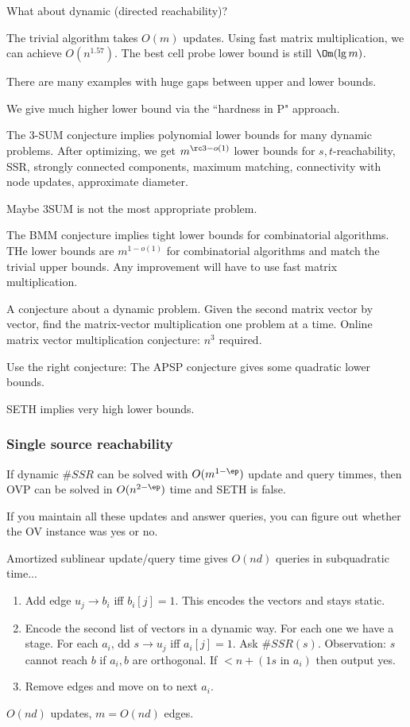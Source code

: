 What about dynamic (directed reachability)?

The trivial algorithm takes $O(m)$ updates. Using fast matrix multiplication, we can achieve $O(n^{1.57})$. The best cell probe lower bound is still $\Om(\lg m)$.

There are many examples with huge gaps between upper and lower bounds.

We give much higher lower bound via the ``hardness in P" approach.

The 3-SUM conjecture implies polynomial lower bounds for many dynamic problems.  After optimizing, we get $m^{\rc3-o(1)}$ lower bounds for $s,t$-reachability, SSR, strongly connected components, maximum matching, connectivity with node updates, approximate diameter.

Maybe 3SUM is not the most appropriate problem.

The BMM conjecture implies tight lower bounds for combinatorial algorithms. THe lower bounds are $m^{1-o(1)}$ for combinatorial algorithms and match the trivial upper bounds.
Any improvement will have to use fast matrix multiplication.

A conjecture about a dynamic problem. Given the second matrix vector by vector, find the matrix-vector multiplication one problem at a time. Online matrix vector multiplication conjecture: $n^3$ required.

Use the right conjecture: 
The APSP conjecture gives some quadratic lower bounds.

SETH implies very high lower bounds. 

\subsubsection{Single source reachability}
If dynamic $\#SSR$ can be solved with $O(m^{1-\ep})$ update and query timmes, then OVP can be solved in $O(n^{2-\ep})$ time and SETH is false.

If you maintain all these updates and answer queries, you can figure out whether the OV instance was yes or no. 

Amortized sublinear update/query time gives $O(nd)$ queries in subquadratic time...


\begin{enumerate}
\item
Add edge $u_j\to b_i$ iff $b_i[j]=1$. This encodes the vectors and stays static.
\item
Encode the second list of vectors in a dynamic way. For each one we have a stage.
For each $a_i$, dd $s\to u_j$ iff $a_i[j]=1$. Ask $\#SSR(s)$. Observation: $s$ cannot reach $b$ if $a_i,b$ are orthogonal. %
If $<n+(1s\text{ in }a_i)$ then output yes.
\item Remove edges and move on to next $a_i$.
\end{enumerate}
$O(nd)$ updates, $m=O(nd)$ edges.

